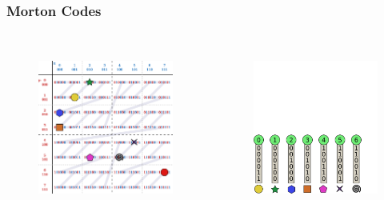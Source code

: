 \documentclass{beamer}
\begin{document}
\begin{frame}
  \frametitle{Morton Codes}
  
\begin{columns}[t]

\begin{figure}
\includegraphics[height=55mm]{Z-curve-primitives.png}
\end{figure}

\begin{figure}
\includegraphics[height=55mm]{keys_6.png}
\end{figure}
\end{columns}
\end{frame}
\end{document}
